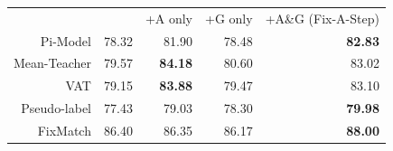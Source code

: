 \begin{tabular}{r | r | r | r | r}
    & ~~~~ & +A only & +G only & +A\&G (Fix-A-Step)
\\ 
    Pi-Model & 78.32 & 81.90 & 78.48 & \textbf{82.83} 
\\ 
    Mean-Teacher & 79.57 & \textbf{84.18} & 80.60 & 83.02
\\ 
    VAT & 79.15 & \textbf{83.88} & 79.47 & 83.10
\\
    Pseudo-label & 77.43 & 79.03 & 78.30 & \textbf{79.98}
\\
    FixMatch & 86.40 & 86.35 & 86.17 & \textbf{88.00}
\end{tabular}